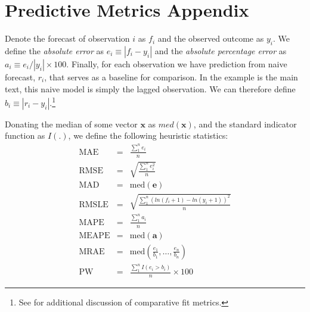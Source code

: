 \documentclass[12pt,fullpage,endnotes]{article}
\begin{document}


 \newpage
 \appendix


 \section*{Predictive Metrics Appendix}

 Denote the forecast of observation $i$ as $f_i$ and the observed
 outcome as $y_i$.  We define the \textit{absolute error} as
 $e_i\equiv |f_i - y_i|$ and the \textit{absolute percentage error} as
 $a_i \equiv e_i / |y_i| \times 100$.  Finally, for each observation we have
 prediction from naive forecast, $r_i$, that serves as a baseline for
 comparison.  In the example is the main text, this naive model is
 simply the lagged observation.  We can therefore define $b_i \equiv
 |r_i - y_i|$.\footnote{See \citet{brandt:freeman:schrodt:2011} for
   additional discussion of comparative fit metrics.}

 Donating the median of some vector $\mathbf{x}$ as $med(\mathbf{x})$,
 and the standard indicator function as $I(.)$, we define the following heuristic statistics:
 \begin{eqnarray*}
 \mathrm{MAE} &=& \frac{\sum_1^n{e_i}}{n}\\
  \mathrm{RMSE} &=& \sqrt{\frac{\sum_1^n{e^2_i}}{n}} \\
  \mathrm{MAD} &=& \mathrm{med}(\mathbf{e}) \\
  \mathrm{RMSLE} &=& \sqrt{\frac{\sum_1^n\left(ln(f_i+1) - ln(y_i+1)  \right)^2}{n}} \\
  \mathrm{MAPE} &=& \frac{\sum_1^n{a_i}}{n} \\
   \mathrm{MEAPE} &=& \mathrm{med}(\mathbf{a}) \\
 \mathrm{MRAE} &=& \mathrm{med}\left(\frac{e_1}{b_1}, \ldots, \frac{e_n}{b_n} \right) \\
 \mathrm{PW} &=& \frac{\sum_1^nI(e_i > b_i)}{n} \times 100
\end{eqnarray*}



\singlespacing


\end{document}
